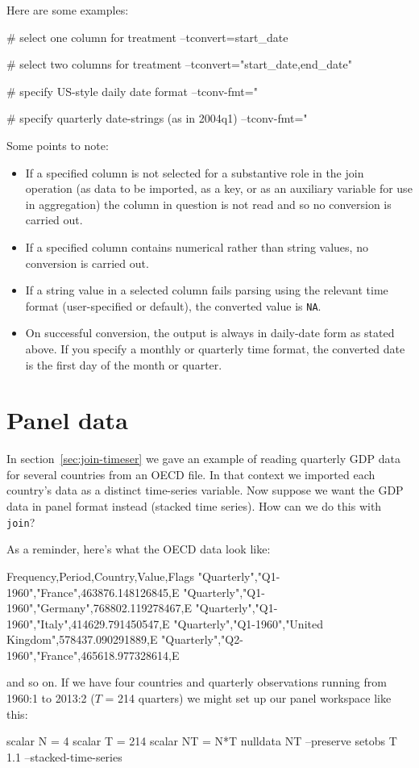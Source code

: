 Here are some examples:

\begin{code}
# select one column for treatment
--tconvert=start_date

# select two columns for treatment
--tconvert="start_date,end_date"

# specify US-style daily date format
--tconv-fmt="%

# specify quarterly date-strings (as in 2004q1)
--tconv-fmt="%
\end{code}

Some points to note:

\begin{itemize}
\item If a specified column is not selected for a substantive role in
  the join operation (as data to be imported, as a key, or as an
  auxiliary variable for use in aggregation) the column in question is
  not read and so no conversion is carried out.
\item If a specified column contains numerical rather than string
  values, no conversion is carried out.
\item If a string value in a selected column fails parsing using the
  relevant time format (user-specified or default), the converted
  value is \texttt{NA}.
\item On successful conversion, the output is always in daily-date
  form as stated above. If you specify a monthly or quarterly time
  format, the converted date is the first day of the month or quarter.
\end{itemize}


\section{Panel data}
\label{sec:join-panel}

In section~\ref{sec:join-timeser} we gave an example of reading
quarterly GDP data for several countries from an OECD file. In that
context we imported each country's data as a distinct time-series
variable. Now suppose we want the GDP data in panel format instead
(stacked time series). How can we do this with \texttt{join}? 

As a reminder, here's what the OECD data look like:
\begin{code}
Frequency,Period,Country,Value,Flags
"Quarterly","Q1-1960","France",463876.148126845,E
"Quarterly","Q1-1960","Germany",768802.119278467,E
"Quarterly","Q1-1960","Italy",414629.791450547,E
"Quarterly","Q1-1960","United Kingdom",578437.090291889,E
"Quarterly","Q2-1960","France",465618.977328614,E
\end{code}
and so on. If we have four countries and quarterly observations
running from 1960:1 to 2013:2 ($T$ = 214 quarters) we might set up our
panel workspace like this:
\begin{code}
scalar N = 4
scalar T = 214
scalar NT = N*T
nulldata NT --preserve
setobs T 1.1 --stacked-time-series
\end{code}

